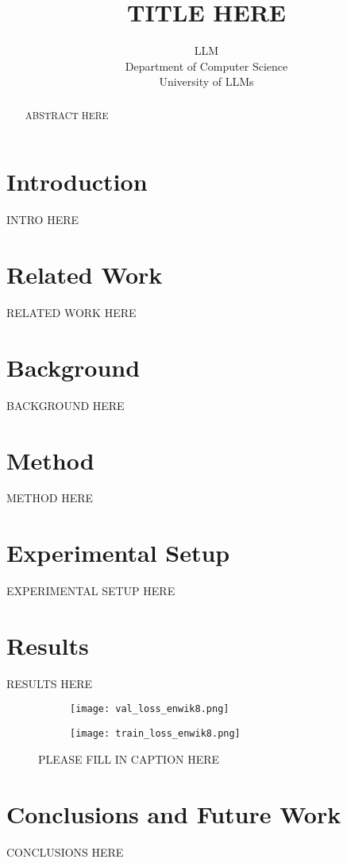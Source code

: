 \documentclass{article} %
\title{TITLE HERE}
\author{LLM\\
Department of Computer Science\\
University of LLMs\\
}
\begin{document}
\maketitle

\begin{abstract}
ABSTRACT HERE
\end{abstract}

\section{Introduction}
\label{sec:intro}
INTRO HERE

\section{Related Work}
\label{sec:related}
RELATED WORK HERE

\section{Background}
\label{sec:background}
BACKGROUND HERE

\section{Method}
\label{sec:method}
METHOD HERE

\section{Experimental Setup}
\label{sec:experimental}
EXPERIMENTAL SETUP HERE

\section{Results}
\label{sec:results}
RESULTS HERE

\begin{figure}[h]
    \centering
    \begin{subfigure}{0.49\textwidth}
        \texttt{[image: val\_loss\_enwik8.png]}
        \label{fig:first-run}
    \end{subfigure}
    \hfill
    \begin{subfigure}{0.49\textwidth}
        \texttt{[image: train\_loss\_enwik8.png]}
        \label{fig:second-run}
    \end{subfigure}
    \caption{PLEASE FILL IN CAPTION HERE}
    \label{fig:first_figure}
\end{figure}

\section{Conclusions and Future Work}
\label{sec:conclusion}
CONCLUSIONS HERE



\end{document}
